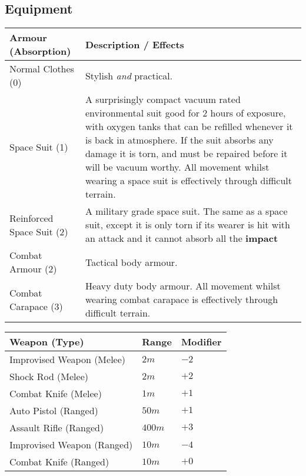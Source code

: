 \documentclass[11pt]{article}
\begin{document}
\begin{multicols}{3}
  \subsection*{Equipment}

  \begin{tabularx}{\linewidth}{lX}
    Armour (Absorption) & Description / Effects \\
    \hline
    Normal Clothes (0) & Stylish \textit{and} practical. \\
    Space Suit (1) & A surprisingly compact vacuum rated environmental suit good for $2$ hours of exposure, with oxygen tanks that can be refilled whenever it is back in atmosphere. If the suit absorbs any damage it is torn, and must be repaired before it will be vacuum worthy. All movement whilst wearing a space suit is effectively through difficult terrain. \\
    Reinforced Space Suit (2) & A military grade space suit. The same as a space suit, except it is only torn if its wearer is hit with an attack and it cannot absorb all the \textbf{impact} \\
    Combat Armour (2) & Tactical body armour. \\
    Combat Carapace (3) & Heavy duty body armour. All movement whilst wearing combat carapace is effectively through difficult terrain.
  \end{tabularx}

  \begin{tabularx}{\linewidth}{lXX}
    Weapon (Type) & Range & Modifier \\
    \hline
    Improvised Weapon (Melee) & $2m$ & $-2$ \\
    Shock Rod (Melee) & $2m$ & $+2$ \\
    Combat Knife (Melee) & $1m$ & $+1$ \\
    Auto Pistol (Ranged) & $50m$ & $+1$ \\
    Assault Rifle (Ranged) & $400m$ & $+3$ \\
    Improvised Weapon (Ranged) & $10m$ & $-4$ \\
    Combat Knife (Ranged) & $10m$ & $+0$
  \end{tabularx}


\end{multicols}
\end{document}

